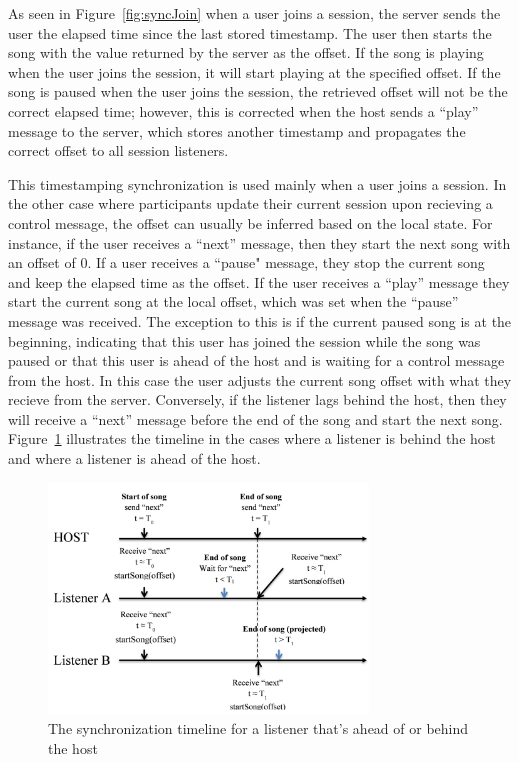 As seen in Figure~\ref{fig:syncJoin} when a user joins a session, 
the server sends the user the elapsed time since the last stored timestamp. 
The user then starts the song with the value returned by the server as 
the offset. If the song is playing when the user joins the session, 
it will start playing at the specified offset. If the song is paused when 
the user joins the session, the retrieved offset will not be the correct 
elapsed time; however, this is corrected when the host sends a ``play'' 
message to the server, which stores another timestamp and propagates
the correct offset to all session listeners.

This timestamping synchronization is used mainly when a user joins a session.
In the other case where participants update their current session upon 
recieving a control message, the offset can usually be inferred based on the 
local state. For instance, if the user receives a ``next'' message, then they
start the next song with an offset of 0. If a user receives a ``pause" 
message, they stop the current song and keep the elapsed time as the offset.
If the user receives a ``play'' message they start the current song at the 
local offset, which was set when the ``pause'' message was received. The 
exception to this is if the current paused song is at the beginning, indicating
that this user has joined the session while the song was paused or that this 
user is ahead of the host and is waiting for a control message from the host. 
In this case the user adjusts the current song offset with what 
they recieve from the server. Conversely, if the listener lags behind the host, 
then they will receive a ``next'' message before the end of the song and start 
the next song. Figure~\ref{fig:syncUsers} illustrates the timeline in the cases 
where a listener is behind the host and where a listener is ahead of the host.

\begin{figure}[t!]
	\centering
	\includegraphics[width=85mm]{syncSessionUsers.png}
	\caption{The synchronization timeline for a listener that's ahead of or behind the host}
	\label{fig:syncUsers}
\end{figure}
